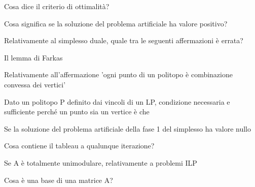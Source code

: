 \documentclass[answers, a4paper, 11pt]{exam}
\begin{document}
\begin{questions}
\begin{solution}
\end{solution}

\question Cosa dice il criterio di ottimalità?
\begin{solution}

\end{solution}

\question Cosa significa se la soluzione del problema artificiale ha valore positivo?
\begin{solution}

\end{solution}

\question Relativamente al simplesso duale, quale tra le seguenti affermazioni è errata?
\begin{solution}

\end{solution}

\question Il lemma di Farkas
\begin{solution}

\end{solution}

\question Relativamente all'affermazione 'ogni punto di un politopo è combinazione convessa dei vertici'
\begin{solution}

\end{solution}

\question Dato un politopo P definito dai vincoli di un LP, condizione necessaria e sufficiente perché un punto sia un vertice è che
\begin{solution}

\end{solution}

\question Se la soluzione del problema artificiale della fase 1 del simplesso ha valore nullo
\begin{solution}

\end{solution}

\question Cosa contiene il tableau a qualunque iterazione?
\begin{solution}

\end{solution}

\question Se A è totalmente unimodulare, relativamente a problemi ILP
\begin{solution}

\end{solution}

\question Cosa è una base di una matrice A?
\begin{solution}


\end{solution}
\end{questions}
\end{document}
